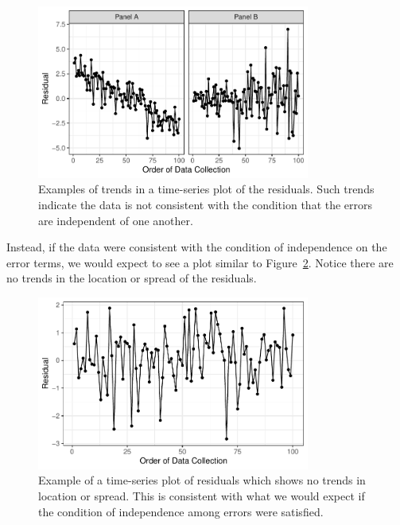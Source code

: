 \documentclass[
  letterpaper,
  DIV=11,
  numbers=noendperiod]{scrreprt}
\theoremstyle{definition}
\theoremstyle{definition}
\theoremstyle{plain}
\theoremstyle{remark}
\begin{document}
\begin{figure}

{\centering \includegraphics[width=0.8\textwidth,height=\textheight]{./images/fig-regassessment-independence-violations-1.pdf}

}

\caption{\label{fig-regassessment-independence-violations}Examples of
trends in a time-series plot of the residuals. Such trends indicate the
data is not consistent with the condition that the errors are
independent of one another.}

\end{figure}

Instead, if the data were consistent with the condition of independence
on the error terms, we would expect to see a plot similar to
Figure~\ref{fig-regassessment-independence-reasonable}. Notice there are
no trends in the location or spread of the residuals.

\begin{figure}

{\centering \includegraphics[width=0.8\textwidth,height=\textheight]{./images/fig-regassessment-independence-reasonable-1.pdf}

}

\caption{\label{fig-regassessment-independence-reasonable}Example of a
time-series plot of residuals which shows no trends in location or
spread. This is consistent with what we would expect if the condition of
independence among errors were satisfied.}

\end{figure}
\end{document}

